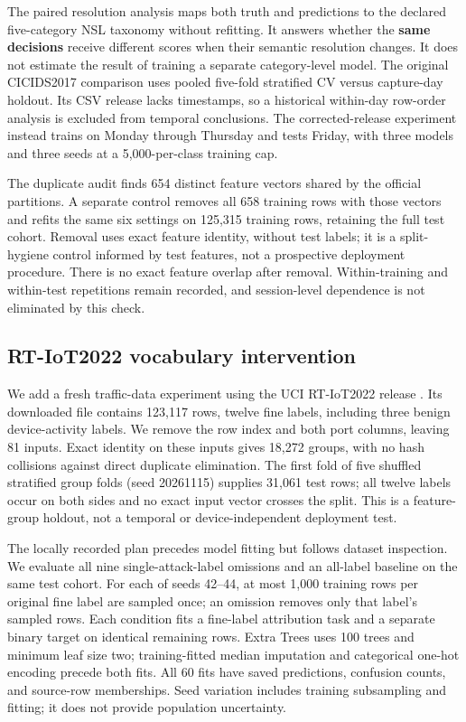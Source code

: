 \documentclass[twocolumn]{svjour3}
\begin{document}
The paired resolution analysis maps both truth and predictions to the declared five-category NSL taxonomy without refitting. It answers whether the \textbf{same decisions} receive different scores when their semantic resolution changes. It does not estimate the result of training a separate category-level model. The original CICIDS2017 comparison uses pooled five-fold stratified CV versus capture-day holdout. Its CSV release lacks timestamps, so a historical within-day row-order analysis is excluded from temporal conclusions. The corrected-release experiment instead trains on Monday through Thursday and tests Friday, with three models and three seeds at a 5,000-per-class training cap.

The duplicate audit finds 654 distinct feature vectors shared by the official partitions. A separate control removes all 658 training rows with those vectors and refits the same six settings on 125,315 training rows, retaining the full test cohort. Removal uses exact feature identity, without test labels; it is a split-hygiene control informed by test features, not a prospective deployment procedure. There is no exact feature overlap after removal. Within-training and within-test repetitions remain recorded, and session-level dependence is not eliminated by this check.

\subsection{RT-IoT2022 vocabulary intervention}
We add a fresh traffic-data experiment using the UCI RT-IoT2022 release \cite{rtiot2024}. Its downloaded file contains 123,117 rows, twelve fine labels, including three benign device-activity labels. We remove the row index and both port columns, leaving 81 inputs. Exact identity on these inputs gives 18,272 groups, with no hash collisions against direct duplicate elimination. The first fold of five shuffled stratified group folds (seed 20261115) supplies 31,061 test rows; all twelve labels occur on both sides and no exact input vector crosses the split. This is a feature-group holdout, not a temporal or device-independent deployment test.

The locally recorded plan precedes model fitting but follows dataset inspection. We evaluate all nine single-attack-label omissions and an all-label baseline on the same test cohort. For each of seeds 42--44, at most 1,000 training rows per original fine label are sampled once; an omission removes only that label's sampled rows. Each condition fits a fine-label attribution task and a separate binary target on identical remaining rows. Extra Trees uses 100 trees and minimum leaf size two; training-fitted median imputation and categorical one-hot encoding precede both fits. All 60 fits have saved predictions, confusion counts, and source-row memberships. Seed variation includes training subsampling and fitting; it does not provide population uncertainty.
\end{document}
